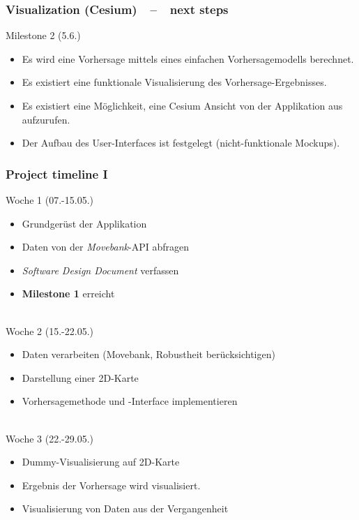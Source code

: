 \documentclass[xcolor=dvipsnames]{beamer}
\begin{document}
\begin{frame}
\begin{columns}
\begin{column}{0.5\textwidth}
\begin{center}
		\end{center}
	\end{column}
	\end{columns}
\end{frame}


\begin{frame}
	\frametitle{\textbf{Visualization (Cesium)}~~--~~next steps}
	\large{Milestone 2 (5.6.)}
	\normalsize
	\begin{itemize} 
		\item \color{LightGray}Es wird eine Vorhersage mittels eines einfachen Vorhersagemodells berechnet.
		\item \color{LightGray}Es existiert eine funktionale Visualisierung des Vorhersage-Ergebnisses.
		\item \color{Green}Es existiert eine Möglichkeit, eine Cesium Ansicht von der Applikation aus aufzurufen.
		\item \color{LightGray}Der Aufbau des User-Interfaces ist festgelegt (nicht-funktionale Mockups).
	\end{itemize} 
\end{frame}


\begin{frame}
	\frametitle{\textbf{Project timeline I}}
	\Large{Woche 1 (07.-15.05.)}
	\normalsize
	~\\
	\begin{itemize}
		\item \color{Green} Grundgerüst der Applikation
		\item \color{Green} Daten von der \textit{Movebank}-API abfragen
		\item \color{Green} \textit{Software Design Document} verfassen
		\item \color{Green} \textbf{Milestone 1} erreicht
	\end{itemize}
	~\\
	\Large{Woche 2 (15.-22.05.)}
	\normalsize		
	~\\
	\begin{itemize}
		\item \color{Green} Daten verarbeiten (Movebank, Robustheit berücksichtigen) 
		\item \color{Green} Darstellung einer 2D-Karte \\
		\item \color{Green} Vorhersagemethode und -Interface implementieren
	\end{itemize}
	~\\		
	\Large{Woche 3 (22.-29.05.)}
	\normalsize
	~\\
	\begin{itemize}
		\item \color{Green} Dummy-Visualisierung auf 2D-Karte \\
		\item \color{Green} Ergebnis der Vorhersage wird visualisiert. \\
		\item \color{Green} Visualisierung von Daten aus der Vergangenheit
	\end{itemize}	
\end{frame}
\end{document}
